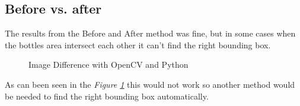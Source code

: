 \subsection{Before vs. after}
The results from the Before and After method was fine, but in some cases when the bottles area intersect each other it can't find the right bounding box. 
\begin{figure}[ht]
    \centering
    \hfill
    \hfill
    \hfill
    \caption{Image Difference with OpenCV and Python}
    \label{figure: imagework}
\end{figure}

As can been seen in the \textit{Figure \ref{figure: imagework}} this would not work so another method would be needed to find the right bounding box automatically. 

